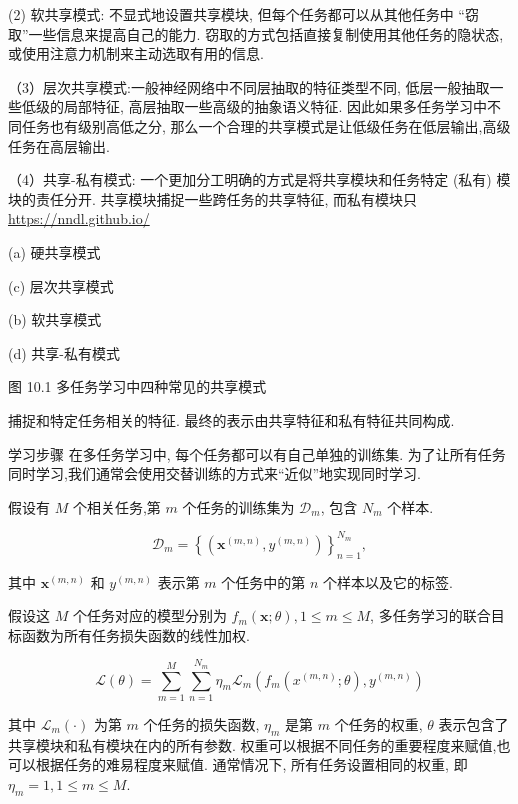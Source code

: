 \documentclass[10pt]{article}
\begin{document}
(2) 软共享模式: 不显式地设置共享模块, 但每个任务都可以从其他任务中 “窃取”一些信息来提高自己的能力. 窃取的方式包括直接复制使用其他任务的隐状态,或使用注意力机制来主动选取有用的信息.

（3）层次共享模式:一般神经网络中不同层抽取的特征类型不同, 低层一般抽取一些低级的局部特征, 高层抽取一些高级的抽象语义特征. 因此如果多任务学习中不同任务也有级别高低之分, 那么一个合理的共享模式是让低级任务在低层输出,高级任务在高层输出.

（4）共享-私有模式: 一个更加分工明确的方式是将共享模块和任务特定 (私有) 模块的责任分开. 共享模块捕捉一些跨任务的共享特征, 而私有模块只 \href{https://nndl.github.io/}{https://nndl.github.io/}



(a) 硬共享模式



(c) 层次共享模式



(b) 软共享模式



(d) 共享-私有模式

图 10.1 多任务学习中四种常见的共享模式

捕捉和特定任务相关的特征. 最终的表示由共享特征和私有特征共同构成.

学习步骤 在多任务学习中, 每个任务都可以有自己单独的训练集. 为了让所有任务同时学习,我们通常会使用交替训练的方式来“近似”地实现同时学习.

假设有 $M$ 个相关任务,第 $m$ 个任务的训练集为 $\mathcal{D}_{m}$, 包含 $N_{m}$ 个样本.


\begin{equation*}
\mathcal{D}_{m}=\left\{\left(\boldsymbol{x}^{(m, n)}, y^{(m, n)}\right)\right\}_{n=1}^{N_{m}}, \tag{10.24}
\end{equation*}


其中 $\boldsymbol{x}^{(m, n)}$ 和 $y^{(m, n)}$ 表示第 $m$ 个任务中的第 $n$ 个样本以及它的标签.

假设这 $M$ 个任务对应的模型分别为 $f_{m}(\boldsymbol{x} ; \theta), 1 \leq m \leq M$, 多任务学习的联合目标函数为所有任务损失函数的线性加权.


\begin{equation*}
\mathcal{L}(\theta)=\sum_{m=1}^{M} \sum_{n=1}^{N_{m}} \eta_{m} \mathcal{L}_{m}\left(f_{m}\left(x^{(m, n)} ; \theta\right), y^{(m, n)}\right) \tag{10.25}
\end{equation*}


其中 $\mathcal{L}_{m}(\cdot)$ 为第 $m$ 个任务的损失函数, $\eta_{m}$ 是第 $m$ 个任务的权重, $\theta$ 表示包含了共享模块和私有模块在内的所有参数. 权重可以根据不同任务的重要程度来赋值,也可以根据任务的难易程度来赋值. 通常情况下, 所有任务设置相同的权重, 即 $\eta_{m}=1,1 \leq m \leq M$.
\end{document}
